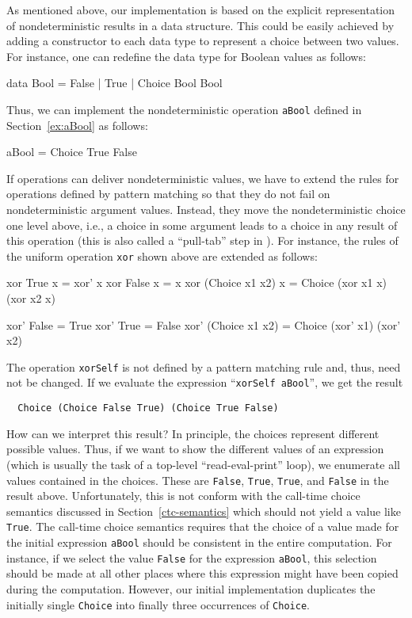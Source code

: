 \documentclass{llncs}
\newcommand{\code}[1]{\mbox{\small\texttt{#1}}}
\newcommand{\ccode}[1]{``\code{#1}''}
\begin{document}
As mentioned above, our implementation is based on the explicit
representation of nondeterministic results in a data structure.
This could be easily achieved by adding a constructor
to each data type to represent a choice between two values.
For instance, one can redefine the data type for Boolean values
as follows:
\begin{haskell}
  data Bool = False | True | Choice Bool Bool
\end{haskell}
Thus, we can implement the nondeterministic operation \code{aBool}
defined in Section~\ref{ex:aBool} as follows:
\begin{haskell}
  aBool = Choice True False
\end{haskell}
If operations can deliver nondeterministic values,
we have to extend the rules for operations defined by
pattern matching so that they do not fail on nondeterministic argument
values. Instead, they move the nondeterministic choice one level above,
i.e., a choice in some argument leads to a choice in any result
of this operation (this is also called a ``pull-tab'' step in
\cite{AlqaddoumiAntoyFischerReck10}). For instance,
the rules of the uniform operation \code{xor} shown above
are extended as follows:
%
\begin{curry}
  xor True           x = xor' x
  xor False          x = x
  xor (Choice x1 x2) x = Choice (xor x1 x) (xor x2 x)

  xor' False          = True
  xor' True           = False
  xor' (Choice x1 x2) = Choice (xor' x1) (xor' x2)
\end{curry}
%
The operation \code{xorSelf} is not defined by a pattern matching rule
and, thus, need not be changed.
If we evaluate the expression \ccode{xorSelf aBool}, we get the result
\begin{lstlisting}
  Choice (Choice False True) (Choice True False)
\end{lstlisting}
How can we interpret this result?
In principle, the choices represent different possible values.
Thus, if we want to show the different values of an expression
(which is usually the task of a top-level ``read-eval-print'' loop),
we enumerate all values contained in the choices.
These are \code{False}, \code{True}, \code{True}, and \code{False}
in the result above.
Unfortunately, this is not conform with the call-time choice semantics
discussed in Section~\ref{ctc-semantics} which should not yield
a value like \code{True}.
The call-time choice semantics requires that the choice
of a value made for
the initial expression \code{aBool} should be consistent
in the entire computation.
For instance, if we select the value \code{False} for the
expression \code{aBool}, this selection should be made
at all other places where this expression might have been copied
during the computation. However, our initial implementation
duplicates the initially single \code{Choice} into finally three
occurrences of \code{Choice}.
\end{document}
